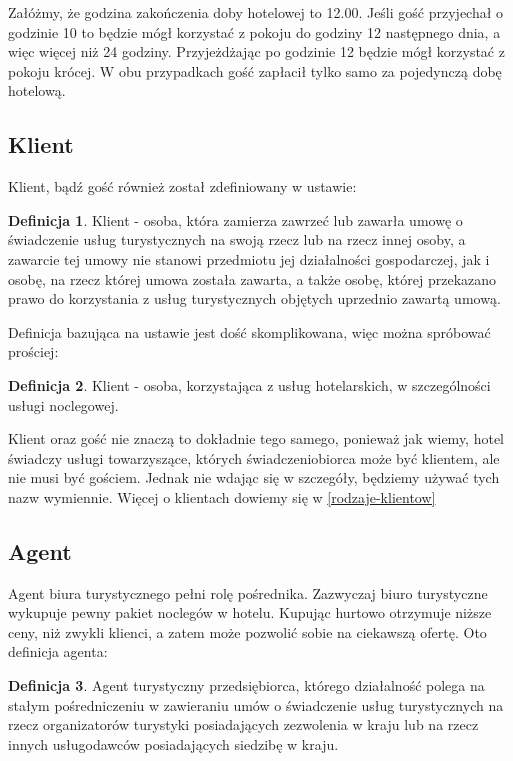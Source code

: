 \documentclass[a4paper,onecolumn,oneside,11pt,wide,floatssmall]{mwrep}
\theoremstyle{definition}
\newtheorem{defn}{Definicja}[section]
\theoremstyle{plain}%
\theoremstyle{remark}
\begin{document}
Załóżmy, że godzina zakończenia doby hotelowej to 12.00. Jeśli gość 
przyjechał o godzinie 10 to będzie mógł korzystać z pokoju do godziny 12 
następnego dnia, a więc więcej niż 24 godziny. Przyjeżdżając po godzinie 12 
będzie mógł korzystać z pokoju krócej. W obu przypadkach gość zapłacił tylko 
samo za pojedynczą dobę hotelową.


\subsection{Klient}

Klient, bądź gość również został zdefiniowany w ustawie\cite{ust:tur}:

\begin{defn}{Klient}
- osoba, która zamierza zawrzeć lub zawarła umowę o świadczenie usług 
turystycznych na swoją rzecz lub na rzecz innej osoby, a zawarcie tej umowy 
nie stanowi przedmiotu jej działalności gospodarczej, jak i osobę, na rzecz 
której umowa została zawarta, a także osobę, której przekazano prawo do 
korzystania z usług turystycznych objętych uprzednio zawartą umową.

\end{defn}

Definicja bazująca na ustawie jest dość skomplikowana, więc można spróbować 
prościej:

\begin{defn}{Klient}
- osoba, korzystająca z usług hotelarskich, w szczególności usługi noclegowej.

\end{defn}

Klient oraz gość nie znaczą to dokładnie tego samego, ponieważ jak wiemy, 
hotel świadczy usługi towarzyszące, których świadczeniobiorca może być 
klientem, ale nie musi być gościem. Jednak nie wdając się w szczegóły, 
będziemy używać tych nazw wymiennie. Więcej o klientach dowiemy się w 
\ref{rodzaje-klientow}

\subsection{Agent}
Agent biura turystycznego pełni rolę pośrednika. Zazwyczaj biuro turystyczne 
wykupuje pewny pakiet noclegów w hotelu. Kupując hurtowo otrzymuje niższe 
ceny, niż zwykli klienci, a zatem może pozwolić sobie na ciekawszą ofertę. 
Oto definicja agenta\cite{ust:tur}:

\begin{defn}{Agent turystyczny}
przedsiębiorca, którego działalność polega na stałym pośredniczeniu w 
zawieraniu umów o świadczenie usług turystycznych na rzecz organizatorów 
turystyki posiadających zezwolenia w kraju lub na rzecz innych usługodawców 
posiadających siedzibę w kraju.
\end{defn}
\end{document}
